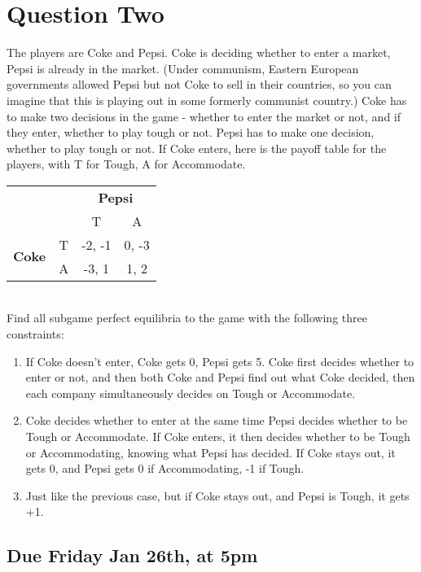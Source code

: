 \documentclass[11pt]{article}
\begin{document}
\newpage

\section*{Question Two}

The players are Coke and Pepsi. Coke is deciding whether to enter a market, Pepsi is already in the market. (Under communism, Eastern European governments allowed Pepsi but not Coke to sell in their countries, so you can imagine that this is playing out in some formerly communist country.) Coke has to make two decisions in the game - whether to enter the market or not, and if they enter, whether to play tough or not. Pepsi has to make one decision, whether to play tough or not. If Coke enters, here is the payoff table for the players, with T for Tough, A for Accommodate.\\

\begin{tabular}{l r | c c}
& & \multicolumn{2}{c}{\textbf{Pepsi}} \\
& & T & A \\ \hline
\multirow{2}{*}{\textbf{Coke}}
& T & -2, -1 & 0, -3 \\
& A & -3, 1 & 1, 2
\end{tabular} \\

Find all subgame perfect equilibria to the game with the following three constraints:

\begin{enumerate}
\item If Coke doesn't enter, Coke gets 0, Pepsi gets 5. Coke first decides whether to enter or not, and then both Coke and Pepsi find out what Coke decided, then each company simultaneously decides on Tough or Accommodate.
\item Coke decides whether to enter at the same time Pepsi decides whether to be Tough or Accommodate. If Coke enters, it then decides whether to be Tough or Accommodating, knowing what Pepsi has decided. If Coke stays out, it gets 0, and Pepsi gets 0 if Accommodating, -1 if Tough.
\item Just like the previous case, but if Coke stays out, and Pepsi is Tough, it gets +1.
\end{enumerate}

\subsection*{Due Friday Jan 26th, at 5pm}
\end{document}
